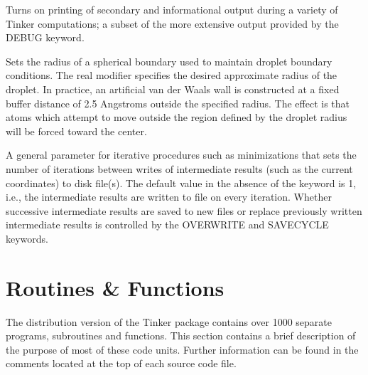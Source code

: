 \documentclass[letterpaper,11pt,english]{sphinxmanual}
\begin{document}
  Turns on printing of secondary and informational output during a variety of Tinker computations; a subset of the more extensive output provided by the DEBUG keyword.






  Sets the radius of a spherical boundary used to maintain droplet boundary conditions. The real modifier specifies the desired approximate radius of the droplet. In practice, an artificial van der Waals wall is constructed at a fixed buffer distance of 2.5 Angstroms outside the specified radius. The effect is that atoms which attempt to move outside the region defined by the droplet radius will be forced toward the center.

  A general parameter for iterative procedures such as minimizations that sets the number of iterations between writes of intermediate results (such as the current coordinates) to disk file(s). The default value in the absence of the keyword is 1, i.e., the intermediate results are written to file on every iteration. Whether successive intermediate results are saved to new files or replace previously written intermediate results is controlled by the OVERWRITE and SAVE\sphinxhyphen{}CYCLE keywords.





\chapter{Routines \& Functions}
\label{\detokenize{text/routines:routines-functions}}\label{\detokenize{text/routines::doc}}
The distribution version of the Tinker package contains over 1000 separate programs, subroutines and functions. This section contains a brief description of the purpose of most of these code units. Further information can be found in the comments located at the top of each source code file.
\end{document}
